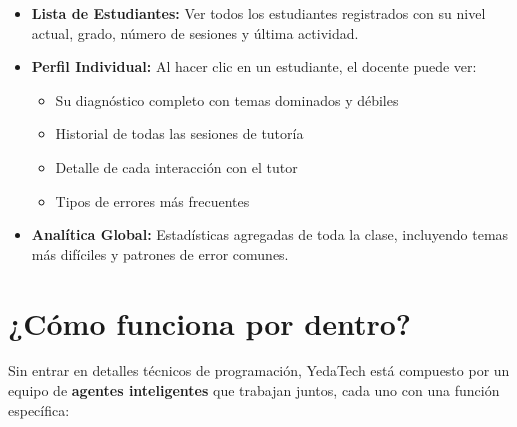 \documentclass[12pt, a4paper]{article}
\begin{document}
\begin{itemize}[leftmargin=*, itemsep=5pt]
    \item[\textcolor{ytOrange}{\faIcon{users}}] \textbf{Lista de Estudiantes:} Ver todos los estudiantes registrados con su nivel actual, grado, número de sesiones y última actividad.
    \item[\textcolor{ytOrange}{\faIcon{user}}] \textbf{Perfil Individual:} Al hacer clic en un estudiante, el docente puede ver:
    \begin{itemize}
        \item Su diagnóstico completo con temas dominados y débiles
        \item Historial de todas las sesiones de tutoría
        \item Detalle de cada interacción con el tutor
        \item Tipos de errores más frecuentes
    \end{itemize}
    \item[\textcolor{ytOrange}{\faIcon{chart-line}}] \textbf{Analítica Global:} Estadísticas agregadas de toda la clase, incluyendo temas más difíciles y patrones de error comunes.
\end{itemize}

\section{¿Cómo funciona por dentro?}

Sin entrar en detalles técnicos de programación, YedaTech está compuesto por un equipo de \textbf{agentes inteligentes} que trabajan juntos, cada uno con una función específica:
\end{document}
